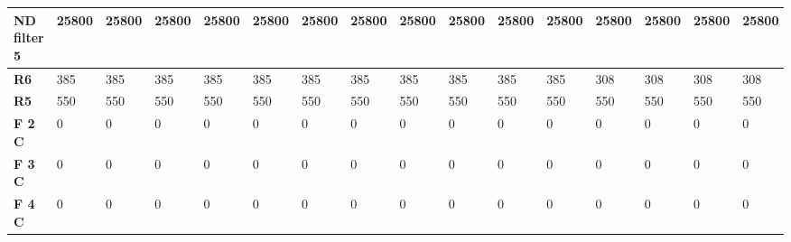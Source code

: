 \begin{footnotesize}
\begin{longtable}{|l|l|l|l|l|l|l|l|l|l|l|l|l|l|l|l|}
\textbf{ND filter 5}&25800&25800&25800&25800&25800&25800&25800&25800&25800&25800&25800&25800&25800&25800&25800\\\hline
\textbf{R6}&385&385&385&385&385&385&385&385&385&385&385&308&308&308&308\\\hline
\textbf{R5}&550&550&550&550&550&550&550&550&550&550&550&550&550&550&550\\\hline
\textbf{F 2 C}&0&0&0&0&0&0&0&0&0&0&0&0&0&0&0\\\hline
\textbf{F 3 C}&0&0&0&0&0&0&0&0&0&0&0&0&0&0&0\\\hline
\textbf{F 4 C}&0&0&0&0&0&0&0&0&0&0&0&0&0&0&0\\\hline
\end{longtable}
\end{footnotesize}